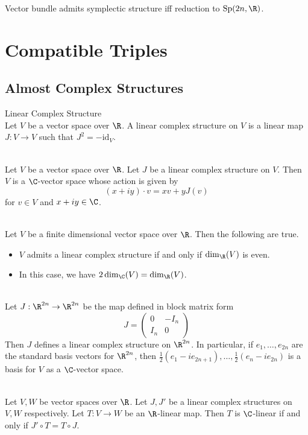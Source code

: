\documentclass[a4paper]{article}
\begin{document}
Vector bundle admits symplectic structure iff reduction to $\text{Sp}(2n,\R)$. 

\pagebreak
\section{Compatible Triples}
\subsection{Almost Complex Structures}
\begin{defn}{Linear Complex Structure}{}\\
Let $V$ be a vector space over $\R$. A linear complex structure on $V$ is a linear map $J:V\to V$ such that $J^2=-\text{id}_V$. 
\end{defn}

\begin{prp}{}{}\\
Let $V$ be a vector space over $\R$. Let $J$ be a linear complex structure on $V$. Then $V$ is a $\C$-vector space whose action is given by $$(x+iy)\cdot v=xv+yJ(v)$$ for $v\in V$ and $x+iy\in\C$. 
\end{prp}

\begin{prp}{}{}\\
Let $V$ be a finite dimensional vector space over $\R$. Then the following are true. 
\begin{itemize}
\item $V$ admits a linear complex structure if and only if $\dim_\R(V)$ is even. 
\item In this case, we have $2\dim_\C(V)=\dim_\R(V)$. 
\end{itemize}
\end{prp}

\begin{eg}{}{}\\
Let $J:\R^{2n}\to\R^{2n}$ be the map defined in block matrix form $$J=\begin{pmatrix}
0 & -I_n\\
I_n & 0
\end{pmatrix}$$
Then $J$ defines a linear complex structure on $\R^{2n}$. In particular, if $e_1,\dots,e_{2n}$ are the standard basis vectors for $\R^{2n}$, then $\frac{1}{2}(e_1-ie_{2n+1}),\dots,\frac{1}{2}(e_n-ie_{2n})$ is a basis for $V$ as a $\C$-vector space. 
\end{eg}

\begin{prp}{}{}\\
Let $V,W$ be vector spaces over $\R$. Let $J,J'$ be a linear complex structures on $V,W$ respectively. Let $T:V\to W$ be an $\R$-linear map. Then $T$ is $\C$-linear if and only if $J'\circ T=T\circ J$. 
\end{prp}
\end{document}

